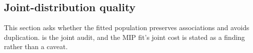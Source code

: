 \documentclass[review]{elsarticle}
\begin{document}
\subsection{Joint-distribution quality}
\label{sec:extval}
This section asks whether the fitted population preserves associations and
avoids duplication.  is the joint audit, and the MIP fit's
joint cost is stated as a finding rather than a caveat.









%
\end{document}
